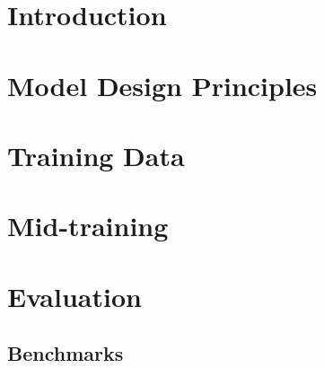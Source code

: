 \documentclass{article}
\begin{document}
\section{Introduction}


\section{Model Design Principles}
\label{sec:model-design-principles}


\section{Training Data}


\section{Mid-training}
\label{sec:mid-training}


\section{Evaluation}
\label{sec:evaluation}




\subsection{Benchmarks}

\end{document}
